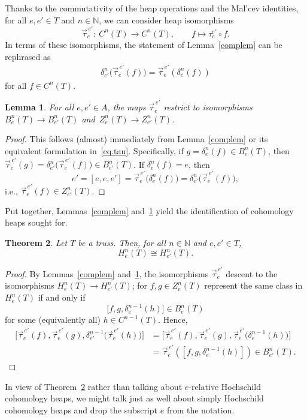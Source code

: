 \documentclass[pdftex]{sigma}
\numberwithin{equation}{section}
\newtheorem{Theorem}{Theorem}[section]
\newtheorem{Lemma}[Theorem]{Lemma}
\newcommand{\N}{\mathbb N}
\begin{document}
Thanks to the commutativity of the heap operations and the Mal'cev identities, for all ${e,e'\in T}$ and $n\in \N$, we can consider heap isomorphisms
\[
\vec{\tau}_e^{\,e'}\colon\ C^n(T)\to C^n(T), \qquad f\mapsto \tau_e^{e'}\circ f.
\]
In terms of these isomorphisms, the statement of Lemma~\ref{complem} can be rephrased as
\begin{gather}\label{eq.tau}
 \delta_{e'}^n \big(\vec{\tau}_e^{\,e'}(f)\big) = \vec{\tau}_e^{\,e'}(\delta_e^n(f))
\end{gather}
for all $f\in C^n(T)$.
\begin{Lemma}\label{lem.b.z}
For all $e,e' \in A$, the maps $\vec{\tau}_e^{\,e'}$ restrict to isomorphisms $B^n_e(T) \to B^n_{e'}(T)$ and~$Z^n_e(T) \to Z^n_{e'}(T)$.
\end{Lemma}
\begin{proof}
This follows (almost) immediately from Lemma~\ref{complem} or its equivalent formulation in~\eqref{eq.tau}. Specifically, if $g = \delta_e^n(f)\in B_e^n(T)$, then
$\vec{\tau}_e^{\,e'}(g) = \delta_{e'}^n\big(\vec{\tau}_e^{\,e'}(f)\big) \in B_{e'}^n(T)$. If $\delta_e^n(f) = e$, then
\[e' = [e,e,e'] = \vec{\tau}_e^{\,e'}\big(\delta_e^n(f)\big) = \delta^{n}_{e'}\big(\vec{\tau}_e^{\,e'}(f)\big),
\]
i.e., $\vec{\tau}_e^{\,e'}(f)\in Z_{e'}^n(T)$.
\end{proof}


Put together, Lemmas~\ref{complem} and~\ref{lem.b.z} yield the identification of cohomology heaps sought for.
\begin{Theorem}\label{thm.Hoch}
 Let $T$ be a truss. Then, for all $n\in \N$ and $e,e'\in T$,
 \[
 H^n_e(T) \cong H^n_{e'}(T).
 \]
\end{Theorem}
\begin{proof}
 By Lemmas~\ref{complem} and~\ref{lem.b.z}, the isomorphisms $\vec{\tau}_e^{\,e'}$ descent to the isomorphisms $H^n_e(T)\to H^n_{e'}(T)$; for $f,g\in Z_e^n(T)$ represent the same class in $H_e^n(T)$ if and only if
 \[\big[f,g,\delta^{n-1}_e(h)\big] \in B_e^n(T)\]
 for some (equivalently all) $h\in C^{n-1}(T)$. Hence,
 \begin{align*}
 \big[\vec{\tau}_e^{\,e'}(f),\vec{\tau}_e^{\,e'}(g),\delta^{n-1}_{e'}\big(\vec{\tau}_e^{\,e'}(h)\big)\big] &=\big[\vec{\tau}_e^{\,e'}(f),\vec{\tau}_e^{\,e'}(g),\vec{\tau}_e^{\,e'}\big(\delta_e^{n-1}(h)\big)\big]\\
 &= \vec{\tau}_e^{\,e'}\left(\left[f,g,\delta_e^{n-1}(h)\right]\right)\in B_{e'}^n(T).\tag*{\qed}
 \end{align*}\renewcommand{\qed}{}
\end{proof}
In view of Theorem~\ref{thm.Hoch} rather than talking about $e$-relative Hochschild cohomology heaps, we might talk just as well about simply Hochschild cohomology heaps and drop the subscript $e$ from the notation.
\end{document}
